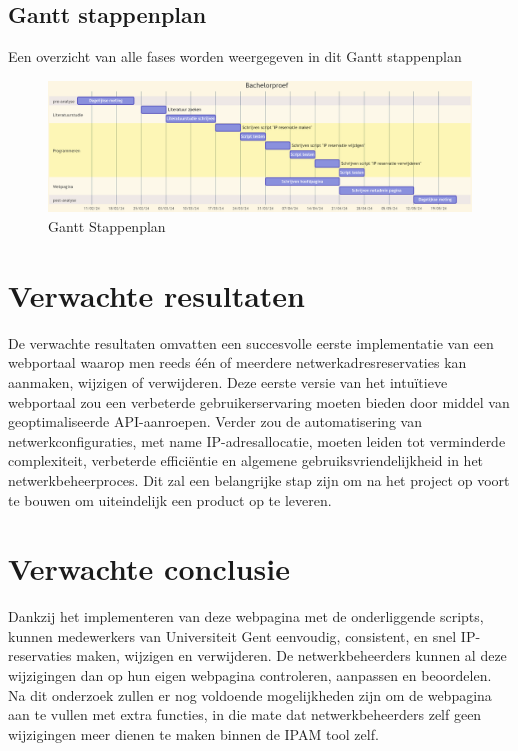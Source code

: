 \subsection{Gantt stappenplan}
Een overzicht van alle fases worden weergegeven in dit Gantt stappenplan
\begin{figure}[h!]
    \includegraphics[scale=0.39]{Gantt}
    \caption{Gantt Stappenplan}
    \label{Gantt Stappenplan}
\end{figure}


\section{Verwachte resultaten}
\label{voorstel:verwachte-resultaten}
De verwachte resultaten omvatten een succesvolle eerste implementatie van een webportaal waarop men reeds één of meerdere netwerkadresreservaties kan aanmaken, wijzigen of verwijderen. Deze eerste versie van het intuïtieve webportaal zou een verbeterde gebruikerservaring moeten bieden door middel van geoptimaliseerde API-aanroepen. Verder zou de automatisering van netwerkconfiguraties, met name IP-adresallocatie, moeten leiden tot verminderde complexiteit, verbeterde efficiëntie en algemene gebruiksvriendelijkheid in het netwerkbeheerproces. Dit zal een belangrijke stap zijn om na het project op voort te bouwen om uiteindelijk een product op te leveren.


\section{Verwachte conclusie}
\label{voorstel:discussie-conclusie}
Dankzij het implementeren van deze webpagina met de onderliggende scripts, kunnen medewerkers van Universiteit Gent eenvoudig, consistent, en snel IP-reservaties maken, wijzigen en verwijderen. De netwerkbeheerders kunnen al deze wijzigingen dan op hun eigen webpagina controleren, aanpassen en beoordelen.
Na dit onderzoek zullen er nog voldoende mogelijkheden zijn om de webpagina aan te vullen met extra functies, in die mate dat netwerkbeheerders zelf geen wijzigingen meer dienen te maken binnen de IPAM tool zelf.

